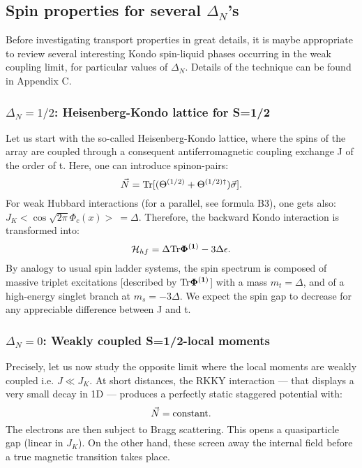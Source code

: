 \subsection{Spin properties for several $\Delta_N$'s}
 
Before investigating transport properties in great details, it is maybe
appropriate to review several interesting 
Kondo spin-liquid phases occurring in
the weak coupling limit, for particular values of
$\Delta_N$. 
Details of the technique can be found in Appendix C.
\subsubsection{$\Delta_N=1/2$: Heisenberg-Kondo lattice for S=1/2}
Let us start with the
so-called Heisenberg-Kondo lattice, where the spins 
of the array are coupled through a consequent
 antiferromagnetic coupling exchange J of the order of t. Here, one can
introduce spinon-pairs:
\begin{equation}
\vec{N}=\hbox{Tr}[({\Theta}^{(1/2)}+{{\Theta}^{(1/2)\dag}})\vec{\sigma}].
\end{equation}
For weak Hubbard interactions (for a parallel, see formula B3), one
gets also: $J_K<\cos\sqrt{2\pi}\Phi_c(x)>\ =\Delta$.
Therefore, the backward Kondo interaction is transformed
into:
\begin{equation}
\label{coset}
{\cal H}_{hf}=\Delta\hbox{Tr}{\bf{\Phi}^{(1)}}-3\Delta\epsilon.
\end{equation}
By analogy to usual spin ladder systems, the spin spectrum is composed of
massive triplet excitations [described
by $\hbox{Tr}{\bf{\Phi}^{(1)}}$] with a mass $m_t=\Delta$, and of a
high-energy singlet branch at $m_s=-3\Delta$\cite{Totsuka-Suzuki}.
We expect
the spin gap to decrease for any appreciable difference between J and t.

\subsubsection{$\Delta_N=0$: Weakly coupled S=1/2-local moments}

Precisely, let us now study the opposite limit
where the local moments are weakly coupled i.e. $J\ll J_K$.
At short distances, the RKKY interaction --- that displays a very small 
decay in
1D --- produces a perfectly static staggered potential with:
\begin{equation}
\vec{N}=\hbox{constant}.
\end{equation} 
The electrons are then subject to Bragg scattering\cite{KLH_Ising}. 
This opens a quasiparticle gap (linear in $J_K$). 
On the other hand, these screen away the internal field before a
true magnetic transition takes place. 

